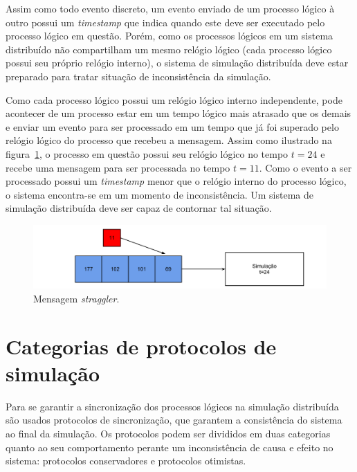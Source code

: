 
Assim como todo evento discreto, um evento enviado de um processo lógico à outro possui um \textit{timestamp} que indica quando este deve ser executado pelo processo lógico em questão. Porém, como os processos lógicos em um sistema distribuído não compartilham um mesmo relógio lógico (cada processo lógico possui seu próprio relógio interno), o sistema de simulação distribuída deve estar preparado para tratar situação de inconsistência da simulação.

Como cada processo lógico possui um relógio lógico interno independente, pode acontecer de um processo estar em um tempo lógico mais atrasado que os demais e enviar um evento para ser processado em um tempo que já foi superado pelo relógio lógico do processo que recebeu a mensagem. Assim como ilustrado na figura~\ref{fig:strag}, o processo em questão possui seu relógio lógico no tempo $t=24$ e recebe uma mensagem para ser processada no tempo $t=11$. Como o evento a ser processado possui um \textit{timestamp} menor que o relógio interno do processo lógico, o sistema encontra-se em um momento de inconsistência. Um sistema de simulação distribuída deve ser capaz de contornar tal situação.

\begin{figure}
  \centerline{\includegraphics[scale=0.4]{straggler.png}}
  \caption{Mensagem \textit{straggler}.}
\label{fig:strag}
\end{figure}

\section{Categorias de protocolos de simulação}


Para se garantir a sincronização dos processos lógicos na simulação distribuída são usados protocolos de sincronização, que garantem a consistência do sistema ao final da simulação. Os protocolos podem ser divididos em duas categorias quanto ao seu comportamento perante um inconsistência de causa e efeito no sistema: protocolos conservadores e protocolos otimistas. 

